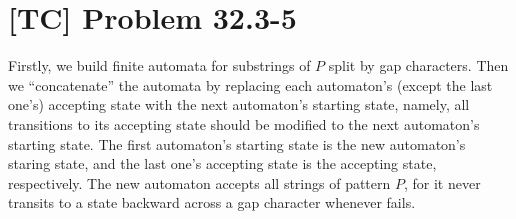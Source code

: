 \documentclass[a4paper,11pt,twocolumn]{article}
\begin{document}
  \section{[TC] Problem 32.3-5}
  Firstly, we build finite automata for substrings of $P$ split by gap characters. Then we ``concatenate'' the automata by replacing each automaton's (except the last one's) accepting state with the next automaton's starting state, namely, all transitions to its accepting state should be modified to the next automaton's starting state. The first automaton's starting state is the new automaton's staring state, and the last one's accepting state is the accepting state, respectively. The new automaton accepts all strings of pattern $P$, for it never transits to a state backward across a gap character whenever fails.
\end{document}
